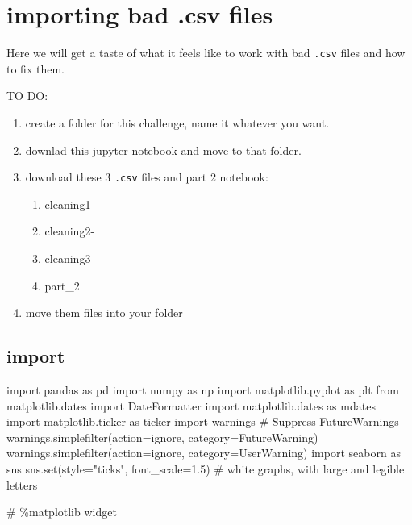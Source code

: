 \documentclass[
  letterpaper,
  DIV=11,
  numbers=noendperiod,
  oneside]{scrreprt}
\newenvironment{Shaded}{\begin{snugshade}}{\end{snugshade}}
\newcommand{\BuiltInTok}[1]{\textcolor[rgb]{0.00,0.23,0.31}{#1}}
\newcommand{\CommentTok}[1]{\textcolor[rgb]{0.37,0.37,0.37}{#1}}
\newcommand{\FloatTok}[1]{\textcolor[rgb]{0.68,0.00,0.00}{#1}}
\newcommand{\ImportTok}[1]{\textcolor[rgb]{0.00,0.46,0.62}{#1}}
\newcommand{\NormalTok}[1]{\textcolor[rgb]{0.00,0.23,0.31}{#1}}
\newcommand{\OperatorTok}[1]{\textcolor[rgb]{0.37,0.37,0.37}{#1}}
\newcommand{\PreprocessorTok}[1]{\textcolor[rgb]{0.68,0.00,0.00}{#1}}
\newcommand{\StringTok}[1]{\textcolor[rgb]{0.13,0.47,0.30}{#1}}
\providecommand{\tightlist}{%
  \setlength{\itemsep}{0pt}\setlength{\parskip}{0pt}}\usepackage{longtable,booktabs,array}
\begin{document}
\hypertarget{importing-bad-.csv-files}{%
\section{importing bad .csv files}\label{importing-bad-.csv-files}}

Here we will get a taste of what it feels like to work with bad
\texttt{.csv} files and how to fix them.

TO DO:

\begin{enumerate}
\def\labelenumi{\arabic{enumi}.}
\tightlist
\item
  create a folder for this challenge, name it whatever you want.
\item
  downlad this jupyter notebook and move to that folder.
\item
  download these 3 \texttt{.csv} files and part 2 notebook:

  \begin{enumerate}
  \def\labelenumii{\arabic{enumii}.}
  \tightlist
  \item
    cleaning1
  \item
    cleaning2-
  \item
    cleaning3
  \item
    part\_2
  \end{enumerate}
\item
  move them files into your folder
\end{enumerate}

\hypertarget{import}{%
\subsection{import}\label{import}}

\begin{Shaded}
\begin{Highlighting}[]
\ImportTok{import}\NormalTok{ pandas }\ImportTok{as}\NormalTok{ pd}
\ImportTok{import}\NormalTok{ numpy }\ImportTok{as}\NormalTok{ np}
\ImportTok{import}\NormalTok{ matplotlib.pyplot }\ImportTok{as}\NormalTok{ plt}
\ImportTok{from}\NormalTok{ matplotlib.dates }\ImportTok{import}\NormalTok{ DateFormatter}
\ImportTok{import}\NormalTok{ matplotlib.dates }\ImportTok{as}\NormalTok{ mdates}
\ImportTok{import}\NormalTok{ matplotlib.ticker }\ImportTok{as}\NormalTok{ ticker}
\ImportTok{import}\NormalTok{ warnings}
\CommentTok{\# Suppress FutureWarnings}
\NormalTok{warnings.simplefilter(action}\OperatorTok{=}\StringTok{\textquotesingle{}ignore\textquotesingle{}}\NormalTok{, category}\OperatorTok{=}\PreprocessorTok{FutureWarning}\NormalTok{)}
\NormalTok{warnings.simplefilter(action}\OperatorTok{=}\StringTok{\textquotesingle{}ignore\textquotesingle{}}\NormalTok{, category}\OperatorTok{=}\PreprocessorTok{UserWarning}\NormalTok{)}
\ImportTok{import}\NormalTok{ seaborn }\ImportTok{as}\NormalTok{ sns}
\NormalTok{sns.}\BuiltInTok{set}\NormalTok{(style}\OperatorTok{=}\StringTok{"ticks"}\NormalTok{, font\_scale}\OperatorTok{=}\FloatTok{1.5}\NormalTok{)  }\CommentTok{\# white graphs, with large and legible letters}

\CommentTok{\# \%matplotlib widget}
\end{Highlighting}
\end{Shaded}
\end{document}
